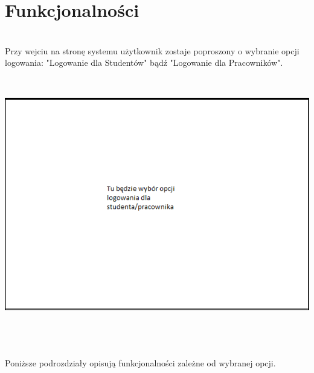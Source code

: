 \documentclass[licencjacka]{pracamgr}
\begin{document}
\chapter{Funkcjonalności}
~\\ \indent
Przy wejciu na stronę systemu użytkownik zostaje poproszony o wybranie opcji logowania: "Logowanie dla Studentów" bądź "Logowanie dla Pracowników". \\ \par
~\\
\begin{minipage}{\linewidth}
	 \centering
           \includegraphics[scale=0.7]{loginlic.png}
\end{minipage} \\ \\ \\

 Poniższe podrozdziały opisują funkcjonalności zależne od wybranej opcji.
\end{document}
